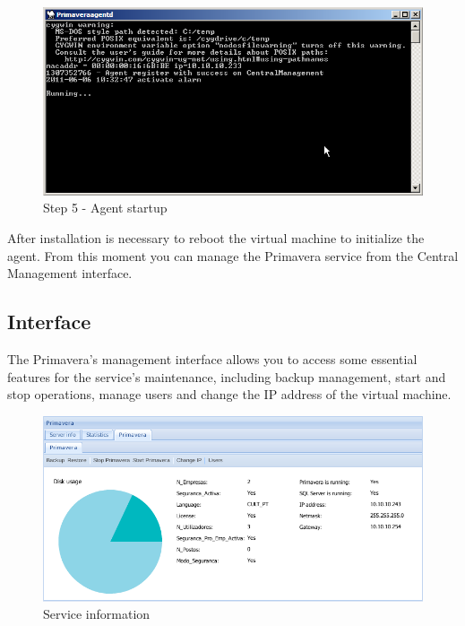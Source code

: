 \begin{figure}[H]
    \begin{center}
    \includegraphics[scale=0.6]{screenshots/primavera/primaverainstall_05.png}
    \caption{Step 5 - Agent startup}
    \label{fig:primavera_install_passo5}
    \end{center}
\end{figure}

After installation is necessary to reboot the virtual machine to initialize the agent.
From this moment you can manage the Primavera service from the Central Management interface.

\subsection{Interface}

The Primavera's management interface allows you to access some essential features for the service's maintenance, including backup management, start and stop operations, manage users and change the IP address of the virtual machine.

\begin{figure}[H]
    \begin{center}
    \includegraphics[scale=0.5]{screenshots/primavera/primaverainterface_01.png}
    \caption{Service information}
    \label{fig:primavera_info}
    \end{center}
\end{figure}

